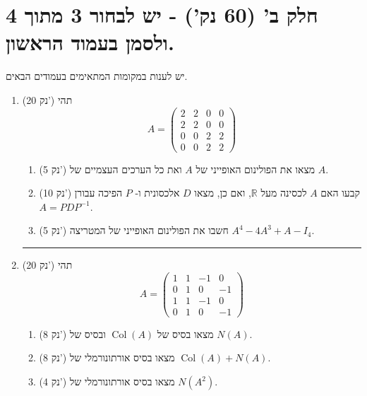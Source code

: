 \documentclass[12pt, a4paper]{article}
\newcommand{\rr}{\mathbb{R}}
\newcommand{\points}[1]{(#1 נק') }
\DeclareMathOperator{\col}{Col}
\begin{document}
\section*{חלק ב' (60 נק') - יש לבחור 3 מתוך 4 ולסמן בעמוד הראשון.}
יש לענות במקומות המתאימים בעמודים הבאים.
\begin{enumerate}
\newcommand{\firstQ}{
\item \points{20}
תהי
\[A = \begin{pmatrix}
    2 & 2 & 0 & 0\\
    2 & 2 & 0 & 0\\
    0 & 0 & 2 & 2 \\
    0 & 0 & 2 & 2
\end{pmatrix} \]
\begin{enumerate}
    \item\points{5} 
    מצאו את הפולינום האופייני של $A$  ואת כל הערכים העצמיים של $A$.
    \item\points{10}
    קבעו
    האם $A$ לכסינה מעל $\rr$,
    ואם כן, מצאו $D$ אלכסונית
    ו-
    $P$
    הפיכה עבורן
    $A=PDP^{-1}$.
    \item\points{5} 
     חשבו את הפולינום האופייני של המטריצה
     $A^4-4A^3+A-I_4$.
    \end{enumerate}

}
\firstQ
\noindent\rule{\textwidth-30pt}{0.4pt}

\newcommand{\secondQ}{
\item \points{20}
תהי
\[
A=
\begin{pmatrix}
1 & 1 & -1 & 0 \\
0 & 1 & 0  & -1 \\
1 & 1 & -1 & 0 \\
0 & 1 & 0 & -1
\end{pmatrix}
\]
\begin{enumerate}
\item\points{8} מצאו בסיס של $\col(A)$ ובסיס של $N(A)$.
\item\points{8}
מצאו בסיס אורתונורמלי של
$\col(A)+N(A)$.
\item\points{4} מצאו בסיס
אורתונורמלי של
$N(A^2)$.

\end{enumerate}
}
\secondQ


\end{enumerate}
\end{document}
